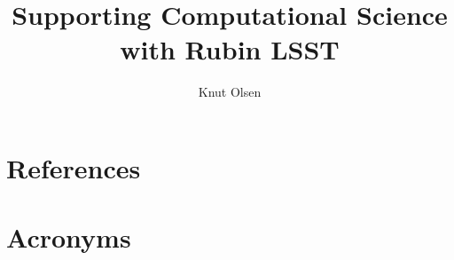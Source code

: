 \documentclass[OPS,authoryear,toc]{lsstdoc}
\title{Supporting Computational Science with Rubin LSST}
\author{%
Knut Olsen
}
\date{\vcsDate}
\begin{document}
\maketitle


\appendix
\section{References} \label{sec:bib}
\renewcommand{\refname}{} %


\section{Acronyms} \label{sec:acronyms}

\end{document}
